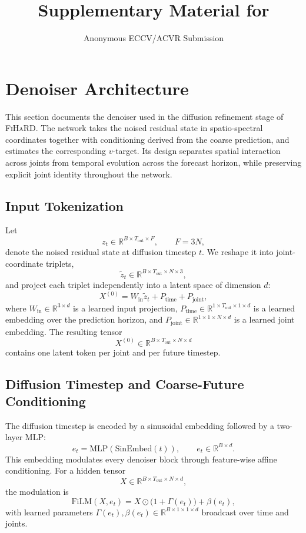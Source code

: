 \documentclass[runningheads]{llncs}
\title{Supplementary Material for \modelname}
\author{Anonymous ECCV/ACVR Submission}
\institute{Paper ID *****}
\newcommand{\modelname}{\textsc{FiHaRD}}
\begin{document}
\maketitle

\section{Denoiser Architecture}
\label{sec:supp_denoiser}

This section documents the denoiser used in the diffusion refinement stage of \modelname{}. The network takes the noised residual state in spatio-spectral coordinates together with conditioning derived from the coarse prediction, and estimates the corresponding $v$-target. Its design separates spatial interaction across joints from temporal evolution across the forecast horizon, while preserving explicit joint identity throughout the network.

\subsection{Input Tokenization}

Let
\[
z_t \in \mathbb{R}^{B \times T_{\mathrm{out}} \times F},
\qquad
F = 3N,
\]
denote the noised residual state at diffusion timestep $t$. We reshape it into joint-coordinate triplets,
\[
\tilde{z}_t \in \mathbb{R}^{B \times T_{\mathrm{out}} \times N \times 3},
\]
and project each triplet independently into a latent space of dimension $d$:
\[
X^{(0)} = W_{\mathrm{in}} \tilde{z}_t + P_{\mathrm{time}} + P_{\mathrm{joint}},
\]
where $W_{\mathrm{in}} \in \mathbb{R}^{3 \times d}$ is a learned input projection, $P_{\mathrm{time}} \in \mathbb{R}^{1 \times T_{\mathrm{out}} \times 1 \times d}$ is a learned embedding over the prediction horizon, and $P_{\mathrm{joint}} \in \mathbb{R}^{1 \times 1 \times N \times d}$ is a learned joint embedding. The resulting tensor
\[
X^{(0)} \in \mathbb{R}^{B \times T_{\mathrm{out}} \times N \times d}
\]
contains one latent token per joint and per future timestep.

\subsection{Diffusion Timestep and Coarse-Future Conditioning}

The diffusion timestep is encoded by a sinusoidal embedding followed by a two-layer MLP:
\[
e_t = \mathrm{MLP}(\mathrm{SinEmbed}(t)),
\qquad
e_t \in \mathbb{R}^{B \times d}.
\]
This embedding modulates every denoiser block through feature-wise affine conditioning. For a hidden tensor
\[
X \in \mathbb{R}^{B \times T_{\mathrm{out}} \times N \times d},
\]
the modulation is
\[
\mathrm{FiLM}(X,e_t)
=
X \odot \bigl(1+\Gamma(e_t)\bigr) + \beta(e_t),
\]
with learned parameters $\Gamma(e_t), \beta(e_t) \in \mathbb{R}^{B \times 1 \times 1 \times d}$ broadcast over time and joints.
\end{document}
